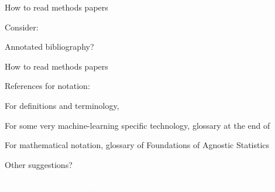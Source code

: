 \documentclass[xcolor={dvipsnames}, handout]{beamer}
\begin{document}
\begin{frame}{How to read methods papers}

Consider:\pause
\begin{wideitemize}
\item Annotated bibliography?
\end{wideitemize}

\end{frame}



\begin{frame}{How to read methods papers}

References for notation:\pause
\begin{wideitemize}
\item For definitions and terminology, \cite{hastie2009elements}
\item For some very machine-learning specific technology, glossary at the end of \cite{breiman2001statistical}
\item For mathematical notation, glossary of \cite{aronow2019foundations} Foundations of Agnostic Statistics
\item Other suggestions?
\end{wideitemize}

\end{frame}




\begin{transitionframe}
\centering

\LARGE \textcolor{white}{Potential outcomes framework.}

\end{transitionframe}
\end{document}
